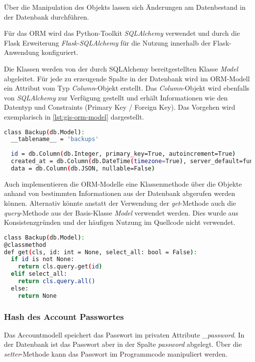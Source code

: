 Über die Manipulation des Objekts lassen sich Änderungen am Datenbestand in der Datenbank durchführen. 

Für das ORM wird das Python-Toolkit \textit{SQLAlchemy} verwendet und durch die Flask Erweiterung \textit{Flask-SQLAlchemy} für die Nutzung innerhalb der Flask-Anwendung konfiguriert. 

Die Klassen werden von der durch SQLAlchemy bereitgestellten Klasse \textit{Model} abgeleitet. Für jede zu erzeugende Spalte in der Datenbank wird im ORM-Modell ein Attribut vom Typ \textit{Column}-Objekt erstellt. Das \textit{Column}-Objekt wird ebenfalls von \textit{SQLAlchemy} zur Verfügung gestellt und erhält Informationen wie den Datentyp und Constraints (Primary Key / Foreign Key).
Das Vorgehen wird exemplarisch in \autoref{lst:gis-orm-model} dargestellt.

\begin{lstlisting}[language=bash, frame=single, caption={GIS Beispiel eines ORM Models}, captionpos=b, label={lst:gis-orm-model}]
class Backup(db.Model):
  __tablename__ = 'backups'
  
  id = db.Column(db.Integer, primary_key=True, autoincrement=True)
  created_at = db.Column(db.DateTime(timezone=True), server_default=func.now(), nullable=False)
  data = db.Column(db.JSON, nullable=False)
\end{lstlisting}

Auch implementieren die ORM-Modelle eine Klassenmethode über die Objekte anhand von bestimmten Informationen aus der Datenbank abgerufen werden können. Alternativ könnte anstatt der Verwendung der \textit{get}-Methode auch die \textit{query}-Methode aus der Basis-Klasse \textit{Model} verwendet werden. Dies wurde aus Konsistenzgründen und der häufigen Nutzung im Quellcode nicht verwendet.

\begin{lstlisting}[language=bash, frame=single, caption={GIS Beispiel einer Get-Methode des ORM Models}, captionpos=b, label={lst:gis-orm-model-get}]
class Backup(db.Model):
@classmethod
def get(cls, id: int = None, select_all: bool = False):
  if id is not None:
    return cls.query.get(id)
  elif select_all:
    return cls.query.all()
  else:
    return None
\end{lstlisting}

\subsubsection{Hash des Account Passwortes}
Das Accountmodell speichert das Passwort im privaten Attribute \textit{\_password}. In der Datenbank ist das Passwort aber in der Spalte \textit{password} abgelegt. Über die \textit{setter}-Methode kann das Passwort im Programmcode manipuliert werden.

